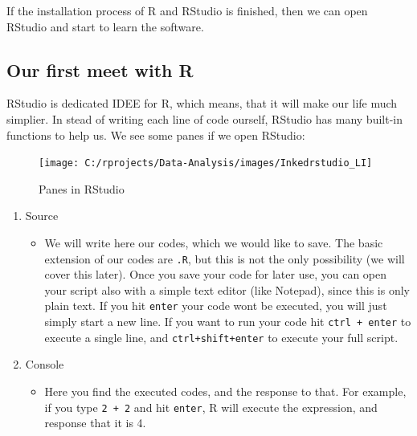 \documentclass[
]{article}
\providecommand{\tightlist}{%
  \setlength{\itemsep}{0pt}\setlength{\parskip}{0pt}}
\begin{document}
If the installation process of R and RStudio is finished, then we can open RStudio and start to learn the software.

\hypertarget{our-first-meet-with-r}{%
\subsection{Our first meet with R}\label{our-first-meet-with-r}}

RStudio is dedicated IDEE for R, which means, that it will make our life much simplier.
In stead of writing each line of code ourself, RStudio has many built-in functions to help us.
We see some panes if we open RStudio:

\begin{figure}

{\centering \texttt{[image: C:/rprojects/Data-Analysis/images/Inkedrstudio\_LI]} 

}

\caption{Panes in RStudio}\label{fig:unnamed-chunk-3}
\end{figure}

\begin{enumerate}
\def\labelenumi{\arabic{enumi}.}
\item
  Source

  \begin{itemize}
  \tightlist
  \item
    We will write here our codes, which we would like to save.
    The basic extension of our codes are \texttt{.R}, but this is not the only possibility (we will cover this later). Once you save your code for later use, you can open your script also with a simple text editor (like Notepad), since this is only plain text. If you hit \texttt{enter} your code wont be executed, you will just simply start a new line. If you want to run your code hit \texttt{ctrl\ +\ enter} to execute a single line, and \texttt{ctrl+shift+enter} to execute your full script.
  \end{itemize}
\item
  Console

  \begin{itemize}
  \tightlist
  \item
    Here you find the executed codes, and the response to that. For example, if you type \texttt{2\ +\ 2} and hit \texttt{enter}, R will execute the expression, and response that it is 4.
  \end{itemize}
\end{enumerate}
\end{document}
